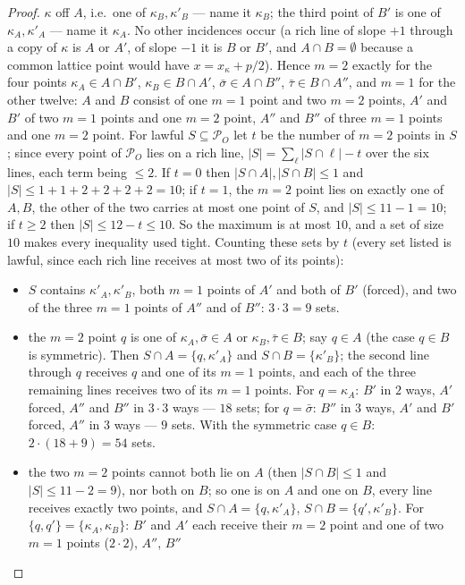 \documentclass[11pt]{article}
\theoremstyle{remark}
\newcommand{\Pset}{\mathcal{P}}
\begin{document}
\begin{proof}
$\kappa$ off $A$, i.e.\ one of $\kappa_B,\kappa'_B$ --- name it $\kappa_B$; the third point of $B'$ is one of $\kappa_A,\kappa'_A$
--- name it $\kappa_A$.  No other incidences occur (a rich line of slope $+1$ through a copy of $\kappa$ is $A$ or $A'$, of
slope $-1$ it is $B$ or $B'$, and $A\cap B=\emptyset$ because a common lattice point would have $x=x_\kappa+p/2$).  Hence
$m=2$ exactly for the four points $\kappa_A\in A\cap B'$, $\kappa_B\in B\cap A'$, $\bar\sigma\in A\cap B''$, $\bar\tau\in B\cap A''$,
and $m=1$ for the other twelve: $A$ and $B$ consist of one $m=1$ point and two $m=2$ points, $A'$ and $B'$ of two $m=1$ points
and one $m=2$ point, $A''$ and $B''$ of three $m=1$ points and one $m=2$ point.
For lawful $S\subseteq\Pset_O$ let $t$ be the number of $m=2$ points in $S$; since every point of $\Pset_O$ lies on a rich
line, $|S|=\sum_{\ell}|S\cap\ell|-t$ over the six lines, each term being $\le2$.  If $t=0$ then $|S\cap A|,|S\cap B|\le1$
and $|S|\le1+1+2+2+2+2=10$; if $t=1$, the $m=2$ point lies on exactly one of $A,B$, the other of the two carries at most one
point of $S$, and $|S|\le11-1=10$; if $t\ge2$ then $|S|\le12-t\le10$.  So the maximum is at most $10$, and a set of size
$10$ makes every inequality used tight.  Counting these sets by $t$ (every set listed is lawful, since each rich line
receives at most two of its points):
\begin{itemize}
\item[$t=0$:] $S$ contains $\kappa'_A,\kappa'_B$, both $m=1$ points of $A'$ and both of $B'$ (forced), and two of the three
 $m=1$ points of $A''$ and of $B''$: $3\cdot3=9$ sets.
\item[$t=1$:] the $m=2$ point $q$ is one of $\kappa_A,\bar\sigma\in A$ or $\kappa_B,\bar\tau\in B$; say $q\in A$ (the case $q\in B$
 is symmetric).  Then $S\cap A=\{q,\kappa'_A\}$ and $S\cap B=\{\kappa'_B\}$; the second line through $q$ receives $q$ and one of
 its $m=1$ points, and each of the three remaining lines receives two of its $m=1$ points.  For $q=\kappa_A$: $B'$ in $2$ ways,
 $A'$ forced, $A''$ and $B''$ in $3\cdot3$ ways --- $18$ sets; for $q=\bar\sigma$: $B''$ in $3$ ways, $A'$ and $B'$ forced, $A''$
 in $3$ ways --- $9$ sets.  With the symmetric case $q\in B$: $2\cdot(18+9)=54$ sets.
\item[$t=2$:] the two $m=2$ points cannot both lie on $A$ (then $|S\cap B|\le1$ and $|S|\le11-2=9$), nor both on $B$; so one is
 on $A$ and one on $B$, every line receives exactly two points, and $S\cap A=\{q,\kappa'_A\}$, $S\cap B=\{q',\kappa'_B\}$.  For
 $\{q,q'\}=\{\kappa_A,\kappa_B\}$: $B'$ and $A'$ each receive their $m=2$ point and one of two $m=1$ points ($2\cdot2$), $A''$, $B''$

\end{itemize}
\end{proof}
\end{document}

